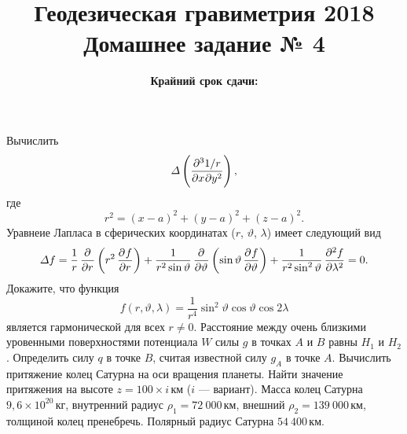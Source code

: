 \documentclass[11pt, a4paper,addpoints]{exam}
\title{{\Large Геодезическая гравиметрия 2018}\\ 
    {\bf\Large Домашнее задание № 4}}
\author{}
\date{\normalsize\bf Крайний срок сдачи: \DTMusedate{deadline}}
\theoremstyle{remark}
\renewcommand{\theta}{\vartheta}
\begin{document}
\maketitle
\thispagestyle{empty}
\begin{questions}
        \question[1] Вычислить
        \begin{equation*}
            \Delta\left( \dmd{1/r}{3}{x}{}{y}{2} \right),
        \end{equation*}
        где
        \begin{equation*}
            r^2 = \left( x - a \right)^2 + \left( y - a \right)^2 + \left( z - a \right)^2.
        \end{equation*}
        \question[1] Уравнеие Лапласа в сферических координатах ($r$, $\theta$, $\lambda$) имеет
        следующий вид
        \begin{equation*}
            \Delta f = \dfrac{1}{r}\dpd{}{r}\left( r^2 \dpd{f}{r} \right) +
            \dfrac{1}{r^2\sin\theta}\dpd{}{\theta}\left( \sin\theta \dpd{f}{\theta} \right) +
            \dfrac{1}{r^2\sin^2\theta}\dpd[2]{f}{\lambda} = 0.
        \end{equation*}
        Докажите, что функция 
        \begin{equation*}
            f\left( r, \theta, \lambda \right) = \dfrac{1}{r^4}\sin^2\theta \cos\theta\cos{2\lambda}
        \end{equation*}
        является гармонической для всех $r\neq 0$.
        \question[1] Расстояние между очень близкими уровенными поверхностями потенциала $W$ силы
        $g$ в точках $A$ и $B$ равны $H_1$ и $H_2$. Определить силу $q$ в точке $B$, считая
        известной силу $g_A$ в точке $A$.
        \question[2] Вычислить притяжение колец Сатурна на оси вращения планеты. Найти значение
        притяжения на высоте $z = 100\times i\,\text{км}$ ($i$ --- вариант). Масса колец Сатурна 
        $9,6\times 10^{20}\,\text{кг}$, внутренний
        радиус $\rho_1 = 72\ 000\,\text{км}$, внешний $\rho_2 = 139\ 000\,\text{км}$, толщиной колец
        пренебречь. Полярный радиус Сатурна $54\ 400\,\text{км}$.
\end{questions}
\end{document}
